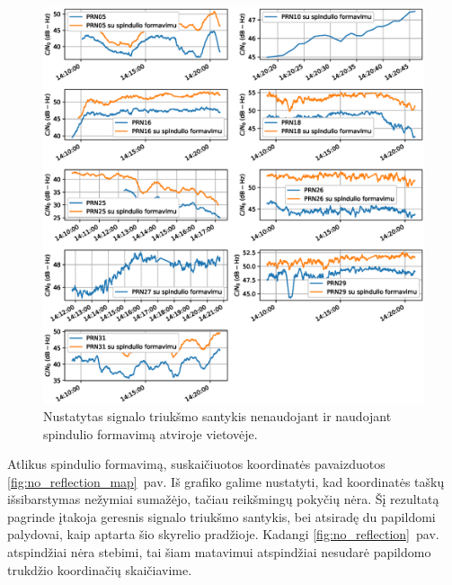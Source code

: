 \documentclass[main.tex]{subfiles}
\begin{document}
\begin{figure}[ht]
    \begin{centering}
    \includegraphics[scale=0.6]{drawings/no_refelection_snr}
    \par\end{centering}
    \protect\caption{\label{fig:no_reflection_snr}Nustatytas signalo triukšmo santykis nenaudojant ir naudojant spindulio formavimą atviroje vietovėje.}
\end{figure}

Atlikus spindulio formavimą, suskaičiuotos koordinatės pavaizduotos \ref{fig:no_reflection_map}~pav.
Iš grafiko galime nustatyti, kad koordinatės taškų išsibarstymas nežymiai sumažėjo, tačiau reikšmingų
pokyčių nėra. Šį rezultatą pagrinde įtakoja geresnis signalo triukšmo santykis, bei atsiradę du papildomi
palydovai, kaip aptarta šio skyrelio pradžioje. Kadangi \ref{fig:no_reflection}~pav. atspindžiai
nėra stebimi, tai šiam matavimui atspindžiai nesudarė papildomo trukdžio koordinačių skaičiavime.
\end{document}
